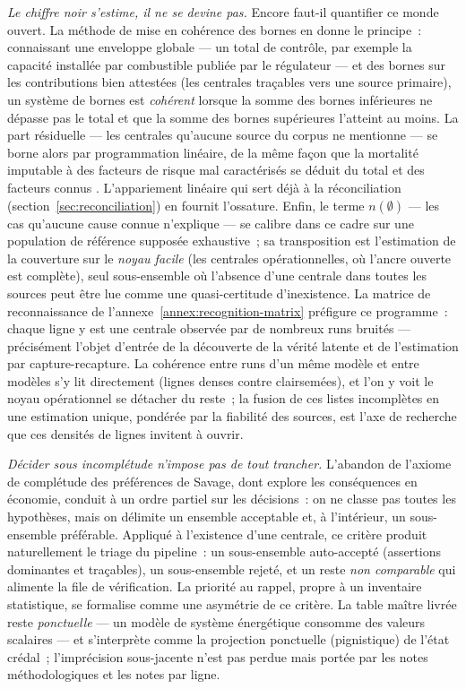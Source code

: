 \documentclass[a4paper,11pt]{report}
\begin{document}
\emph{Le chiffre noir s'estime, il ne se devine pas.} Encore faut-il quantifier ce monde ouvert. La méthode de mise en cohérence des bornes \citep{HaDuong2005} en donne le principe~: connaissant une enveloppe globale --- un total de contrôle, par exemple la capacité installée par combustible publiée par le régulateur --- et des bornes sur les contributions bien attestées (les centrales traçables vers une source primaire), un système de bornes est \emph{cohérent} lorsque la somme des bornes inférieures ne dépasse pas le total et que la somme des bornes supérieures l'atteint au moins. La part résiduelle --- les centrales qu'aucune source du corpus ne mentionne --- se borne alors par programmation linéaire, de la même façon que la mortalité imputable à des facteurs de risque mal caractérisés se déduit du total et des facteurs connus \citep{HaDuong2005}. L'appariement linéaire qui sert déjà à la réconciliation (section~\ref{sec:reconciliation}) en fournit l'ossature. Enfin, le terme $n(\emptyset)$ --- les cas qu'aucune cause connue n'explique --- se calibre dans ce cadre sur une population de référence supposée exhaustive~; sa transposition est l'estimation de la couverture sur le \emph{noyau facile} (les centrales opérationnelles, où l'ancre ouverte est complète), seul sous-ensemble où l'absence d'une centrale dans toutes les sources peut être lue comme une quasi-certitude d'inexistence. La matrice de reconnaissance de l'annexe~\ref{annex:recognition-matrix} préfigure ce programme~: chaque ligne y est une centrale observée par de nombreux runs bruités --- précisément l'objet d'entrée de la découverte de la vérité latente et de l'estimation par capture-recapture. La cohérence entre runs d'un même modèle et entre modèles s'y lit directement (lignes denses contre clairsemées), et l'on y voit le noyau opérationnel se détacher du reste~; la fusion de ces listes incomplètes en une estimation unique, pondérée par la fiabilité des sources, est l'axe de recherche que ces densités de lignes invitent à ouvrir.

\emph{Décider sous incomplétude n'impose pas de tout trancher.} L'abandon de l'axiome de complétude des préférences de Savage, dont \citet{HaDuong2005} explore les conséquences en économie, conduit à un ordre partiel sur les décisions~: on ne classe pas toutes les hypothèses, mais on délimite un ensemble acceptable et, à l'intérieur, un sous-ensemble préférable. Appliqué à l'existence d'une centrale, ce critère produit naturellement le triage du pipeline~: un sous-ensemble auto-accepté (assertions dominantes et traçables), un sous-ensemble rejeté, et un reste \emph{non comparable} qui alimente la file de vérification. La priorité au rappel, propre à un inventaire statistique, se formalise comme une asymétrie de ce critère. La table maître livrée reste \emph{ponctuelle} --- un modèle de système énergétique consomme des valeurs scalaires --- et s'interprète comme la projection ponctuelle (pignistique) de l'état crédal~; l'imprécision sous-jacente n'est pas perdue mais portée par les notes méthodologiques et les notes par ligne.
\end{document}
